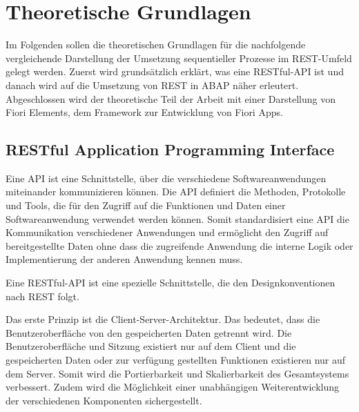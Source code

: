 \chapter{Theoretische Grundlagen}

Im Folgenden sollen die theoretischen Grundlagen für die nachfolgende vergleichende Darstellung der Umsetzung sequentieller Prozesse im REST-Umfeld gelegt werden. Zuerst wird grundsätzlich erklärt, was eine RESTful-API ist und danach wird auf die Umsetzung von REST in ABAP näher erleutert. Abgeschlossen wird der theoretische Teil der Arbeit mit einer Darstellung von Fiori Elements, dem Framework zur Entwicklung von Fiori Apps.

\section{RESTful Application Programming Interface}

Eine API ist eine Schnittstelle, über die verschiedene Softwareanwendungen miteinander kommunizieren können. Die API definiert die Methoden, Protokolle und Tools, die für den Zugriff auf die Funktionen und Daten einer Softwareanwendung verwendet werden können. Somit standardisiert eine API die Kommunikation verschiedener Anwendungen und ermöglicht den Zugriff auf bereitgestellte Daten ohne dass die zugreifende Anwendung die interne Logik oder Implementierung der anderen Anwendung kennen muss.

Eine RESTful-API ist eine spezielle Schnittstelle, die den Designkonventionen nach REST folgt.

Das erste Prinzip ist die Client-Server-Architektur. Das bedeutet, dass die Benutzeroberfläche von den gespeicherten Daten getrennt wird. Die Benutzeroberfläche und Sitzung existiert nur auf dem Client und die gespeicherten Daten oder zur verfügung gestellten Funktionen existieren nur auf dem Server. Somit wird die Portierbarkeit und Skalierbarkeit des Gesamtsystems verbessert. Zudem wird die Möglichkeit einer unabhängigen Weiterentwicklung der verschiedenen Komponenten sichergestellt.

